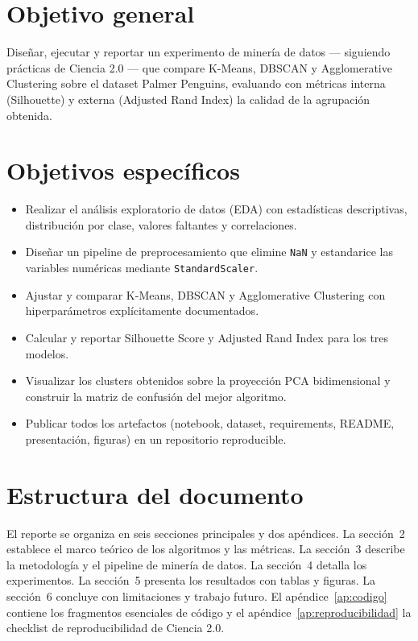 \section{Objetivo general}

Diseñar, ejecutar y reportar un experimento de minería de datos --- siguiendo prácticas de Ciencia 2.0 --- que compare K-Means, DBSCAN y Agglomerative Clustering sobre el dataset Palmer Penguins, evaluando con métricas interna (Silhouette) y externa (Adjusted Rand Index) la calidad de la agrupación obtenida.

\section{Objetivos específicos}

\begin{itemize}
  \item Realizar el análisis exploratorio de datos (EDA) con estadísticas descriptivas, distribución por clase, valores faltantes y correlaciones.
  \item Diseñar un pipeline de preprocesamiento que elimine \texttt{NaN} y estandarice las variables numéricas mediante \texttt{StandardScaler}.
  \item Ajustar y comparar K-Means, DBSCAN y Agglomerative Clustering con hiperparámetros explícitamente documentados.
  \item Calcular y reportar Silhouette Score y Adjusted Rand Index para los tres modelos.
  \item Visualizar los clusters obtenidos sobre la proyección PCA bidimensional y construir la matriz de confusión del mejor algoritmo.
  \item Publicar todos los artefactos (notebook, dataset, requirements, README, presentación, figuras) en un repositorio reproducible.
\end{itemize}

\section{Estructura del documento}

El reporte se organiza en seis secciones principales y dos apéndices. La sección~2 establece el marco teórico de los algoritmos y las métricas. La sección~3 describe la metodología y el pipeline de minería de datos. La sección~4 detalla los experimentos. La sección~5 presenta los resultados con tablas y figuras. La sección~6 concluye con limitaciones y trabajo futuro. El apéndice~\ref{ap:codigo} contiene los fragmentos esenciales de código y el apéndice~\ref{ap:reproducibilidad} la checklist de reproducibilidad de Ciencia 2.0.
